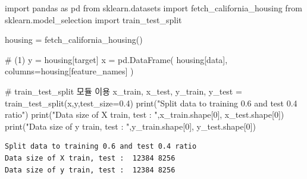 \documentclass[
  letterpaper,
  DIV=11,
  numbers=noendperiod]{scrartcl}
\newenvironment{Shaded}{\begin{snugshade}}{\end{snugshade}}
\newcommand{\BuiltInTok}[1]{\textcolor[rgb]{0.00,0.23,0.31}{#1}}
\newcommand{\CommentTok}[1]{\textcolor[rgb]{0.37,0.37,0.37}{#1}}
\newcommand{\DecValTok}[1]{\textcolor[rgb]{0.68,0.00,0.00}{#1}}
\newcommand{\FloatTok}[1]{\textcolor[rgb]{0.68,0.00,0.00}{#1}}
\newcommand{\ImportTok}[1]{\textcolor[rgb]{0.00,0.46,0.62}{#1}}
\newcommand{\NormalTok}[1]{\textcolor[rgb]{0.00,0.23,0.31}{#1}}
\newcommand{\OperatorTok}[1]{\textcolor[rgb]{0.37,0.37,0.37}{#1}}
\newcommand{\StringTok}[1]{\textcolor[rgb]{0.13,0.47,0.30}{#1}}
\begin{document}
\begin{Shaded}
\begin{Highlighting}[]
\ImportTok{import}\NormalTok{ pandas }\ImportTok{as}\NormalTok{ pd}
\ImportTok{from}\NormalTok{ sklearn.datasets }\ImportTok{import}\NormalTok{ fetch\_california\_housing}
\ImportTok{from}\NormalTok{ sklearn.model\_selection }\ImportTok{import}\NormalTok{ train\_test\_split}

\NormalTok{housing }\OperatorTok{=}\NormalTok{ fetch\_california\_housing()}

\CommentTok{\# (1)}
\NormalTok{y }\OperatorTok{=}\NormalTok{ housing[}\StringTok{\textquotesingle{}target\textquotesingle{}}\NormalTok{]}
\NormalTok{x }\OperatorTok{=}\NormalTok{ pd.DataFrame( housing[}\StringTok{\textquotesingle{}data\textquotesingle{}}\NormalTok{], columns}\OperatorTok{=}\NormalTok{housing[}\StringTok{\textquotesingle{}feature\_names\textquotesingle{}}\NormalTok{] )}

\CommentTok{\# train\_test\_split 모듈 이용}
\NormalTok{x\_train, x\_test, y\_train, y\_test }\OperatorTok{=}\NormalTok{ train\_test\_split(x,y,test\_size}\OperatorTok{=}\FloatTok{0.4}\NormalTok{)}
\BuiltInTok{print}\NormalTok{(}\StringTok{"Split data to training 0.6 and test 0.4 ratio"}\NormalTok{)}
\BuiltInTok{print}\NormalTok{(}\StringTok{"Data size of X train, test : "}\NormalTok{,x\_train.shape[}\DecValTok{0}\NormalTok{], x\_test.shape[}\DecValTok{0}\NormalTok{])}
\BuiltInTok{print}\NormalTok{(}\StringTok{"Data size of y train, test : "}\NormalTok{,y\_train.shape[}\DecValTok{0}\NormalTok{], y\_test.shape[}\DecValTok{0}\NormalTok{])}
\end{Highlighting}
\end{Shaded}

\begin{verbatim}
Split data to training 0.6 and test 0.4 ratio
Data size of X train, test :  12384 8256
Data size of y train, test :  12384 8256
\end{verbatim}
\end{document}

